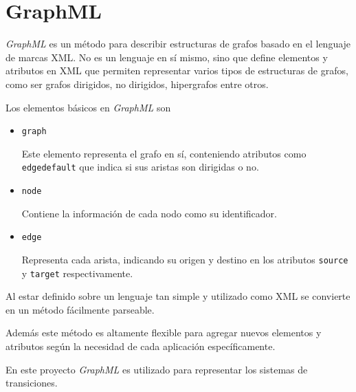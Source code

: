\section{GraphML}
\textit{GraphML} es un método para describir estructuras de grafos basado en el lenguaje
 de marcas XML.
No es un lenguaje en sí mismo, sino que define elementos y atributos en XML que permiten
 representar varios tipos de estructuras de grafos, como ser grafos dirigidos, no dirigidos,
 hipergrafos entre otros.

Los elementos básicos en \textit{GraphML} son
\begin{itemize}
\item \texttt{graph}

Este elemento representa el grafo en sí, conteniendo atributos como \texttt{edgedefault}
 que indica si sus aristas son dirigidas o no.

\item \texttt{node}

Contiene la información de cada nodo como su identificador.

\item \texttt{edge}

Representa cada arista, indicando su origen y destino en los atributos \texttt{source} y
 \texttt{target} respectivamente.

\end{itemize}

Al estar definido sobre un lenguaje tan simple y utilizado como XML se convierte en un método
 fácilmente parseable.

Además este método es altamente flexible para agregar nuevos elementos y atributos según
 la necesidad de cada aplicación específicamente.

En este proyecto \textit{GraphML} es utilizado para representar los sistemas de transiciones.